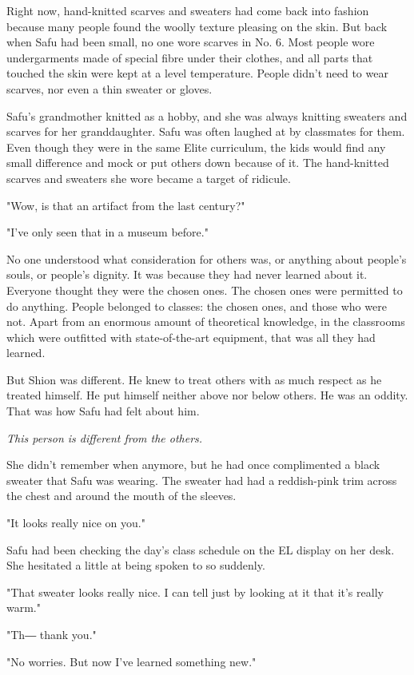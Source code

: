 Right now, hand-knitted scarves and sweaters had come back into fashion
because many people found the woolly texture pleasing on the skin. But
back when Safu had been small, no one wore scarves in No. 6. Most people
wore undergarments made of special fibre under their clothes, and all
parts that touched the skin were kept at a level temperature. People
didn't need to wear scarves, nor even a thin sweater or gloves.

Safu's grandmother knitted as a hobby, and she was always knitting
sweaters and scarves for her granddaughter. Safu was often laughed at by
classmates for them. Even though they were in the same Elite curriculum,
the kids would find any small difference and mock or put others down
because of it. The hand-knitted scarves and sweaters she wore became a
target of ridicule.

"Wow, is that an artifact from the last century?"

"I've only seen that in a museum before."

No one understood what consideration for others was, or anything about
people's souls, or people's dignity. It was because they had never
learned about it. Everyone thought they were the chosen ones. The chosen
ones were permitted to do anything. People belonged to classes: the
chosen ones, and those who were not. Apart from an enormous amount of
theoretical knowledge, in the classrooms which were outfitted with
state-of-the-art equipment, that was all they had learned.

But Shion was different. He knew to treat others with as much respect as
he treated himself. He put himself neither above nor below others. He
was an oddity. That was how Safu had felt about him.

\emph{This person is different from the others.}

She didn't remember when anymore, but he had once complimented a black
sweater that Safu was wearing. The sweater had had a reddish-pink trim
across the chest and around the mouth of the sleeves.

"It looks really nice on you."

Safu had been checking the day's class schedule on the EL display on her
desk. She hesitated a little at being spoken to so suddenly.

"That sweater looks really nice. I can tell just by looking at it that
it's really warm."

"Th― thank you."

"No worries. But now I've learned something new."

